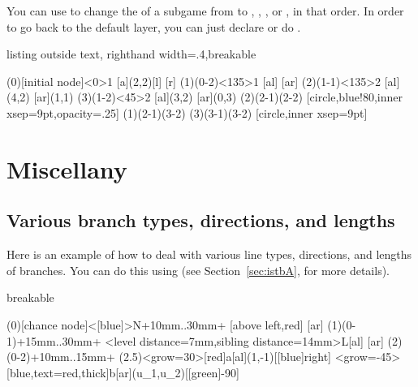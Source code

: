 You can use \icmd{\setxtsubgamelayer} to change the  of a subgame from  to , , , or , in that order. In order to go back to the default layer, you can just declare \cmd{\setxtsubgamelayer} or do \cmd{\setxtsubgamelayer\{\}}.

\begin{tcblisting}{listing outside text, righthand width=.4\linewidth,breakable}
\begin{istgame}
\xtdistance{15mm}{30mm}
\istroot[-135](0)[initial node]<0>{1}
  [a]{(2,2)}[l]
  [r]   \endist 
\istroot(1)(0-2)<135>{1}
  [al]
  [ar]  \endist 
\xtdistance{10mm}{20mm}
\istroot(2)(1-1)<135>{2}
  \istb{\ell}[al]{(4,2)}
  [ar]{(1,1)}
  \endist 
\istroot(3)(1-2)<45>{2}
  \istb{\ell}[al]{(3,2)}
  [ar]{(0,3)}
  \endist 
{}
\xtSubgameOval*(2){(2-1)(2-2)}%
  [circle,blue!80,inner xsep=9pt,opacity=.25]
\setxtsubgamelayer %
\xtSubgameBox*(1){(2-1)(3-2)}
\xtSubgameOval(3){(3-1)(3-2)}%
  [circle,inner xsep=9pt]
\end{istgame}
\end{tcblisting}


\section{Miscellany}

\subsection{Various branch types, directions, and lengths} 

Here is an example of how to deal with various line types, directions, and lengths of branches.
You can do this using \cmd{\istbA} (see Section~\ref{sec:istbA}, for more details).
\begin{tcblisting}{breakable}
\begin{istgame}
\istroot(0)[chance node]<[blue]>{N}+10mm..30mm+
  [above left,red]
  [ar]  \endist
\istroot(1)(0-1)+15mm..30mm+
  \istb<level distance=7mm,sibling distance=14mm>{L}[al]
  [ar]  \endist
\istroot(2)(0-2)+10mm..15mm+
  \istbA(2.5)<grow=30>[red]{a}[al]{(1,-1)}[[blue]right]
  \istb*<grow=-45>[blue,text=red,thick]{b}[ar]{(u_1,u_2)}[[green]-90]  \endist
\end{istgame}
\end{tcblisting}


